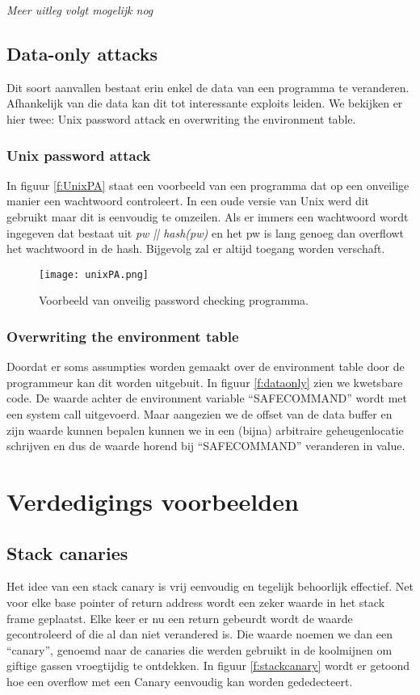 \documentclass[../main.tex]{subfiles}
\begin{document}
\textit{Meer uitleg volgt mogelijk nog}



\subsection{Data-only attacks}
Dit soort aanvallen bestaat erin enkel de data van een programma te veranderen.
Afhankelijk van die data kan dit tot interessante exploits leiden.
We bekijken er hier twee: Unix password attack en overwriting the environment table.
\subsubsection{Unix password attack}
In figuur \ref{f:UnixPA} staat een voorbeeld van een programma dat op een onveilige manier een wachtwoord controleert.
In een oude versie van Unix werd dit gebruikt maar dit is eenvoudig te omzeilen.
Als er immers een wachtwoord wordt ingegeven dat bestaat uit \emph{pw || hash(pw)} en het pw is lang genoeg dan overflowt het wachtwoord in de hash.
Bijgevolg zal er altijd toegang worden verschaft.

\begin{figure}
\centering
\texttt{[image: unixPA.png]}
\caption{Voorbeeld van onveilig password checking programma.}
\label{f:unixPA}
\end{figure}

\subsubsection{Overwriting the environment table}
Doordat er soms assumpties worden gemaakt over de environment table door de programmeur kan dit worden uitgebuit.
In figuur \ref{f:dataonly} zien we kwetsbare code.
De waarde achter de environment variable ``SAFECOMMAND'' wordt met een system call uitgevoerd.
Maar aangezien we de offset van de data buffer en zijn waarde kunnen bepalen kunnen we in een (bijna) arbitraire geheugenlocatie schrijven en dus de waarde horend bij ``SAFECOMMAND'' veranderen in value.



\section{Verdedigings voorbeelden}
\subsection{Stack canaries}
Het idee van een stack canary is vrij eenvoudig en tegelijk behoorlijk effectief.
Net voor elke base pointer of return address wordt een zeker waarde in het stack frame geplaatst.
Elke keer er nu een return gebeurdt wordt de waarde gecontroleerd of die al dan niet verandered is.
Die waarde noemen we dan een ``canary'', genoemd naar de canaries die werden gebruikt in de koolmijnen om giftige gassen vroegtijdig te ontdekken.
In figuur \ref{f:stackcanary} wordt er getoond hoe een overflow met een Canary eenvoudig kan worden gededecteert.
\end{document}
